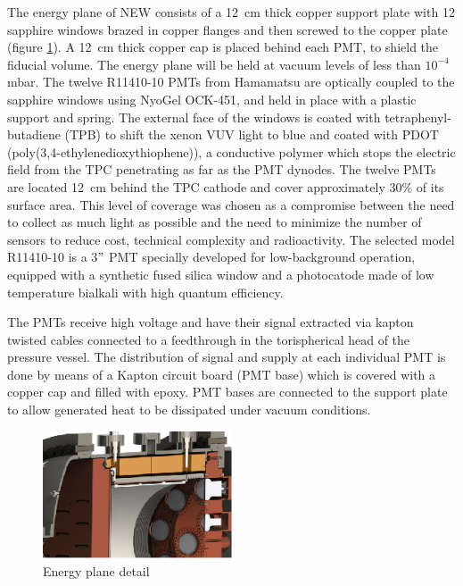 \documentclass[a4paper, 10pt, oneside, twocolumn, 3p]{elsarticle}
\begin{document}
\par The energy plane of NEW consists of a 12~cm thick copper support plate with 12 sapphire windows brazed in copper flanges and then screwed to the copper plate (figure \ref{fig:detail}). A 12~cm thick copper cap is placed behind each PMT, to shield the fiducial volume. The energy plane will be held at vacuum levels of less than $10^{-4}$ mbar. The twelve R11410-10 \cite{PMT} PMTs from Hamamatsu are optically coupled to the sapphire windows using NyoGel OCK-451, and held in place with a plastic support and spring. The external face of the windows is coated with tetraphenyl-butadiene (TPB) to shift the xenon VUV light to blue and coated with PDOT (poly(3,4-ethylenedioxythiophene)), a conductive polymer which stops the electric field from the TPC penetrating as far as the PMT dynodes. The twelve PMTs are located 12~cm behind the TPC cathode and cover approximately 30\% of its surface area. This level of coverage was chosen as a compromise between the need to collect as much light as possible and the need to minimize the number of sensors to reduce cost, technical complexity and radioactivity.  The selected model R11410-10 is a 3$"$ PMT specially developed for low-background operation, equipped with a synthetic fused silica window and a photocatode made of low temperature bialkali with high quantum efficiency. 

\par The PMTs receive high voltage and have their signal extracted via kapton twisted cables connected to a feedthrough in the torispherical head of the pressure vessel. The distribution of signal and supply at each individual PMT is done by means of a Kapton circuit board (PMT base) which is covered with a copper cap and filled with epoxy. PMT bases are connected to the support plate to allow generated heat to be dissipated under vacuum conditions.

\begin{figure}
  \begin{center}
   	 \includegraphics[width=0.5\textwidth]{./figures/EP_detalle.png}   
   	 \caption{Energy plane detail}
   	 \label{fig:detail}
  \end{center}
\end{figure}
\end{document}
